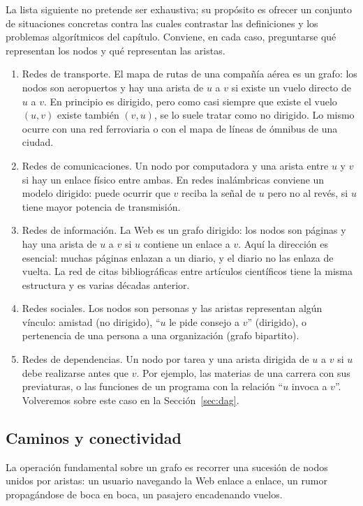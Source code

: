 \documentclass[12pt, spanish, oneside, openany]{book}
\theoremstyle{uprightplain}
\theoremstyle{definition}
\theoremstyle{remark}
\theoremstyle{definition}
\begin{document}
La lista siguiente no pretende ser exhaustiva; su propósito es ofrecer un conjunto de situaciones concretas contra las cuales contrastar las definiciones y los problemas algorítmicos del capítulo. Conviene, en cada caso, preguntarse qué representan los nodos y qué representan las aristas.

\begin{enumerate}
    \item Redes de transporte. El mapa de rutas de una compañía aérea es un grafo: los nodos son aeropuertos y hay una arista de $u$ a $v$ si existe un vuelo directo de $u$ a $v$. En principio es dirigido, pero como casi siempre que existe el vuelo $(u,v)$ existe también $(v,u)$, se lo suele tratar como no dirigido. Lo mismo ocurre con una red ferroviaria o con el mapa de líneas de ómnibus de una ciudad.
    \item Redes de comunicaciones. Un nodo por computadora y una arista entre $u$ y $v$ si hay un enlace físico entre ambas. En redes inalámbricas conviene un modelo dirigido: puede ocurrir que $v$ reciba la señal de $u$ pero no al revés, si $u$ tiene mayor potencia de transmisión.
    \item Redes de información. La Web es un grafo dirigido: los nodos son páginas y hay una arista de $u$ a $v$ si $u$ contiene un enlace a $v$. Aquí la dirección es esencial: muchas páginas enlazan a un diario, y el diario no las enlaza de vuelta. La red de citas bibliográficas entre artículos científicos tiene la misma estructura y es varias décadas anterior.
    \item Redes sociales. Los nodos son personas y las aristas representan algún vínculo: amistad (no dirigido), ``$u$ le pide consejo a $v$'' (dirigido), o pertenencia de una persona a una organización (grafo bipartito).
    \item Redes de dependencias. Un nodo por tarea y una arista dirigida de $u$ a $v$ si $u$ debe realizarse antes que $v$. Por ejemplo, las materias de una carrera con sus previaturas, o las funciones de un programa con la relación ``$u$ invoca a $v$''. Volveremos sobre este caso en la Sección~\ref{sec:dag}.
\end{enumerate}

\subsection{Caminos y conectividad}

La operación fundamental sobre un grafo es recorrer una sucesión de nodos unidos por aristas: un usuario navegando la Web enlace a enlace, un rumor propagándose de boca en boca, un pasajero encadenando vuelos.
\end{document}
